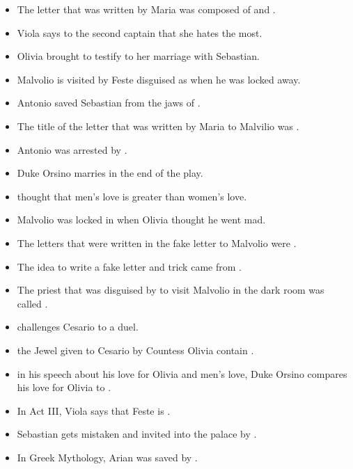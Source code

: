 \documentclass[12pt, a4paper]{article}
\begin{document}
\begin{itemize}
  \item[\ding{109}]  The letter that was written by Maria was composed of  and .
                                                                                                       
  \item[\ding{109}]  Viola says to the second captain that she hates  the most.

  \item[\ding{109}] Olivia brought  to testify to her marriage with Sebastian.


  \item[\ding{109}] Malvolio is visited by Feste disguised as  when he was locked away.

  \item[\ding{109}] Antonio saved Sebastian from the jaws of .

  \item[\ding{109}] The title of the letter that was written by Maria to Malvilio was .

  \item[\ding{109}] Antonio was arrested by .

    
  \item[\ding{109}] Duke Orsino marries  in the end of the play.
  \item[\ding{109}]  thought that men's love is greater than women's love.
  \item[\ding{109}] Malvolio was locked in  when Olivia thought he went mad.

  
  \item[\ding{109}] The letters that were written in the fake letter to Malvolio were .
  \item[\ding{109}] The idea to write a fake letter and trick  came from .
  \item[\ding{109}] The priest that was disguised by   to visit Malvolio in the dark room was 
    called .

  \item[\ding{109}]  challenges Cesario to a duel.
  \item[\ding{109}]  the Jewel given to Cesario by Countess Olivia contain .
  \item[\ding{109}] in his speech about his love for Olivia and men's love, Duke Orsino compares his
    love for Olivia to .
  \item[\ding{109}] In Act III, Viola says that Feste is .

  \item[\ding{109}] Sebastian gets mistaken and invited into the palace by .
  \item[\ding{109}] In Greek Mythology, Arian was saved by .

\end{itemize}
\end{document}
